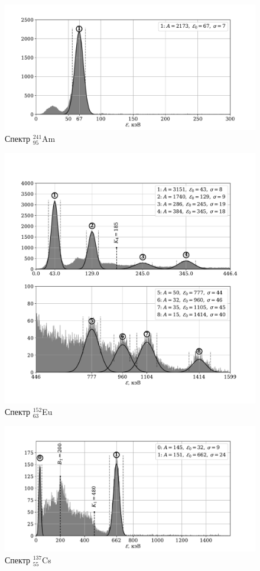 \documentclass[a4paper,12pt]{article} %
\begin{document}
\begin{figure}
\centering
\includegraphics[width=\textwidth]{spectrum_am.pdf}
\caption{Спектр $^{241}_{95}$Am}
\label{fig:am}
\end{figure}

\begin{figure}
\centering
\includegraphics[width=\textwidth]{spectrum_eu.pdf}
\caption{Спектр $^{152}_{63}$Eu}
\label{fig:eu}
\end{figure}

\begin{figure}
\centering
\includegraphics[width=\textwidth]{spectrum_cs.pdf}
\caption{Спектр $^{137}_{55}$Cs}
\label{fig:cs}
\end{figure}
\end{document}
